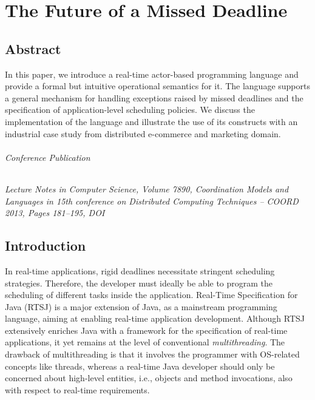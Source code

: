 
\chapter[The Future of a Missed Deadline]{The Future of a Missed Deadline}
% 
\label{ch:p01:ch02}
% 

\section*{Abstract}
In this paper, we introduce a real-time actor-based programming language
and provide a formal but intuitive  operational semantics for it. 
The language supports a general mechanism for handling exceptions raised by missed deadlines
and the specification of application-level scheduling policies.
We discuss  the implementation of the language and 
illustrate the use of its constructs with an industrial case study from distributed e-commerce and marketing domain. 

\subparagraph*{Conference Publication}
\emph{Lecture Notes in Computer Science, Volume 7890, Coordination Models and Languages in 15th conference on Distributed Computing Techniques -- COORD 2013, Pages 181--195, DOI }


\section{Introduction} \label{ch02:sec:introduction}

In real-time applications, rigid deadlines necessitate stringent scheduling strategies.
Therefore, the developer must ideally be able to program the scheduling of different tasks inside the application.
Real-Time Specification for Java (RTSJ) \cite{jsr1,jsr282} is a major extension of Java, as a mainstream programming language, aiming at enabling real-time application development. 
Although RTSJ extensively enriches Java with a framework for 
the  specification of real-time applications, 
it yet remains at the level of conventional \textit{multithreading}.
The drawback of multithreading is that it involves the programmer with OS-related concepts like threads, whereas a real-time Java developer should only be concerned about high-level entities, i.e., objects and method invocations, also with respect to 
real-time requirements.

